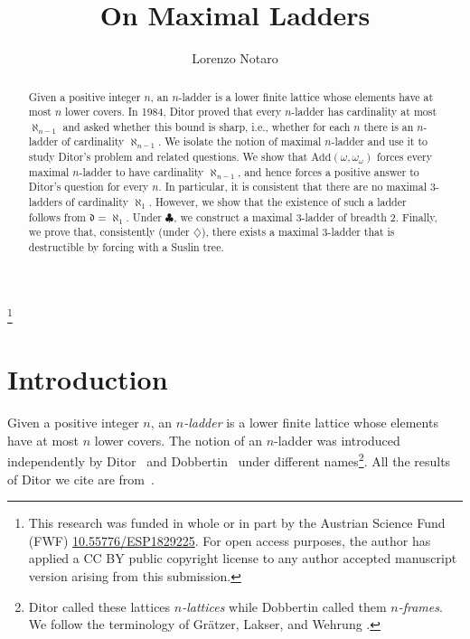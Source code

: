 \documentclass[]{amsart}
\theoremstyle{definition}
\theoremstyle{remark}
\begin{document}
\title{On Maximal Ladders}

\author{Lorenzo Notaro}
\address{University of Vienna, Institute of Mathematics, Kurt G\"{o}del Research Center, Kolingasse 14-16, 1090 Vienna, Austria}
\curraddr{}

\begin{abstract}
Given a positive integer $n$, an $n$-ladder is a lower finite lattice whose elements have at most $n$ lower covers. In 1984, Ditor proved that every $n$-ladder has cardinality at most $\aleph_{n-1}$ and asked whether this bound is sharp, i.e., whether for each $n$ there is an $n$-ladder of cardinality $\aleph_{n-1}$. We isolate the notion of maximal $n$-ladder and use it to study Ditor's problem and related questions. We show that $\text{Add}(\omega, \omega_\omega)$ forces every maximal $n$-ladder to have cardinality $\aleph_{n-1}$, and hence forces a positive answer to Ditor's question for every $n$. In particular, it is consistent that there are no maximal $3$-ladders of cardinality $\aleph_1$. However, we show that the existence of such a ladder follows from $\mathfrak{d}=\aleph_1$. Under $\clubsuit$, we construct a maximal $3$-ladder of breadth $2$. Finally, we prove that, consistently (under $\diamondsuit$), there exists a maximal $3$-ladder that is destructible by forcing with a Suslin tree.
\end{abstract}

\thanks{This research was funded in whole or in part by the Austrian Science Fund (FWF) \href{https://www.fwf.ac.at/en/research-radar/10.55776/ESP1829225}{10.55776/ESP1829225}. For open access purposes, the author has applied a CC BY public copyright license to any author accepted manuscript version arising from this submission.}


\maketitle

{
  \hypersetup{linkcolor=black}
  \tableofcontents
}

\section{Introduction}


 Given a positive integer $n$, an \emph{$n$-ladder} is a lower finite lattice whose elements have at most $n$ lower covers. The notion of an $n$-ladder was introduced independently by Ditor~\cite{MR0732199} and Dobbertin~\cite{MR862871} under different names\footnote{Ditor called these lattices \emph{$n$-lattices} while Dobbertin called them \emph{$n$-frames}. We follow the terminology of Gr\"{a}tzer, Lakser, and Wehrung \cite{MR1768850}.}. All the results of Ditor we cite are from~\cite{MR0732199}.
 
\end{document}

